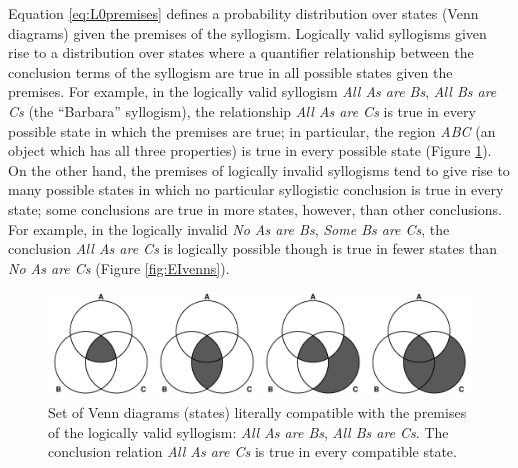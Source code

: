 \documentclass[floatsintext, doc]{apa6}
\begin{document}
Equation \ref{eq:L0premises} defines a probability distribution over states (Venn diagrams) given the premises of the syllogism. 
Logically valid syllogisms given rise to a distribution over states where a quantifier relationship between the conclusion terms of the syllogism are true in all possible states given the premises. 
For example, in the logically valid syllogism  \emph{All As are Bs}, \emph{All Bs are Cs} (the ``Barbara'' syllogism), the relationship \emph{All As are Cs} is true in every possible state in which the premises are true; in particular, the region \emph{ABC} (an object which has all three properties) is true in every possible state (Figure \ref{fig:AAvenns}).
On the other hand, the premises of logically invalid syllogisms tend to give rise to many possible states in which no particular syllogistic conclusion is true in every state; some conclusions are true in more states, however, than other conclusions.
For example, in the logically invalid \emph{No As are Bs}, \emph{Some Bs are Cs}, the conclusion \emph{All As are Cs} is logically possible though is true in fewer states than \emph{No As are Cs} (Figure \ref{fig:EIvenns}).


\begin{figure}[t]
\centering
\includegraphics[width = \textwidth]{figs/diagrams_allAB_allBC.pdf}
\caption{Set of Venn diagrams (states) literally compatible with the premises of the logically valid syllogism: \emph{All As are Bs}, \emph{All Bs are Cs}. The conclusion relation \emph{All As are Cs} is true in every compatible state.}
\label{fig:AAvenns}
\end{figure}
\end{document}
